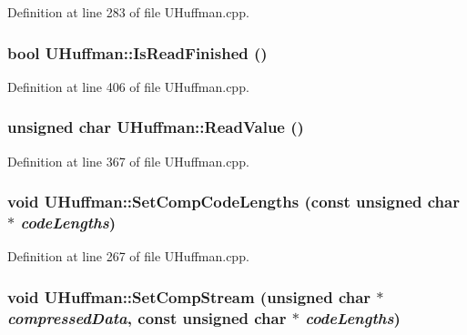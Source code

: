 Definition at line 283 of file UHuffman.cpp.\hypertarget{class_u_huffman_7286b963c43a2fa051e7a9956dc54e67}{
\subsubsection[{IsReadFinished}]{\setlength{\rightskip}{0pt plus 5cm}bool UHuffman::IsReadFinished ()}}
\label{class_u_huffman_7286b963c43a2fa051e7a9956dc54e67}




Definition at line 406 of file UHuffman.cpp.\hypertarget{class_u_huffman_c7ca2b479e621b555778358d6b02aa11}{
\subsubsection[{ReadValue}]{\setlength{\rightskip}{0pt plus 5cm}unsigned char UHuffman::ReadValue ()}}
\label{class_u_huffman_c7ca2b479e621b555778358d6b02aa11}




Definition at line 367 of file UHuffman.cpp.\hypertarget{class_u_huffman_9597786e7e70571b8d790728380b71ac}{
\subsubsection[{SetCompCodeLengths}]{\setlength{\rightskip}{0pt plus 5cm}void UHuffman::SetCompCodeLengths (const unsigned char $\ast$ {\em codeLengths})}}
\label{class_u_huffman_9597786e7e70571b8d790728380b71ac}




Definition at line 267 of file UHuffman.cpp.\hypertarget{class_u_huffman_40bee73e851e01e05190575b1e11e4bd}{
\subsubsection[{SetCompStream}]{\setlength{\rightskip}{0pt plus 5cm}void UHuffman::SetCompStream (unsigned char $\ast$ {\em compressedData}, \/  const unsigned char $\ast$ {\em codeLengths})}}
\label{class_u_huffman_40bee73e851e01e05190575b1e11e4bd}




